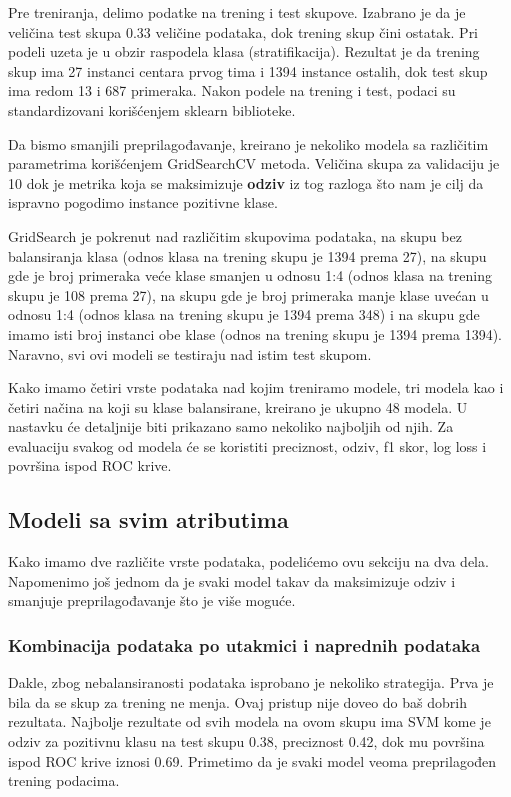 \documentclass[a4paper]{article}
\begin{document}
Pre treniranja, delimo podatke na trening i test skupove. Izabrano je da je
veličina test skupa 0.33 veličine podataka, dok trening skup čini ostatak. Pri
podeli uzeta je u obzir raspodela klasa (stratifikacija). Rezultat je da trening skup ima 27 instanci centara prvog tima i 1394 instance ostalih, dok test skup ima redom 13 i 687 primeraka. Nakon podele na trening i test, podaci su standardizovani korišćenjem sklearn biblioteke.

Da bismo smanjili preprilagođavanje, kreirano je nekoliko modela sa različitim parametrima korišćenjem GridSearchCV metoda. Veličina skupa za validaciju je 10 dok je metrika koja se maksimizuje \textbf{odziv} iz tog razloga što nam je cilj da ispravno pogodimo instance pozitivne klase.

GridSearch je pokrenut nad različitim skupovima podataka, na skupu bez
balansiranja klasa (odnos klasa na trening skupu je 1394 prema 27), na skupu
gde je broj primeraka veće klase smanjen u odnosu 1:4 (odnos klasa na trening
skupu je 108 prema 27), na skupu gde je broj primeraka manje klase uvećan u
odnosu 1:4 (odnos klasa na trening skupu je 1394 prema 348) i na skupu gde
imamo isti broj instanci obe klase (odnos na trening skupu je 1394 prema 1394).
Naravno, svi ovi modeli se testiraju nad istim test skupom.

Kako imamo četiri vrste podataka nad kojim treniramo modele, tri modela
kao i četiri načina na koji su klase balansirane, kreirano je ukupno 48 modela. U
nastavku će detaljnije biti prikazano samo nekoliko najboljih od njih. Za evaluaciju svakog od modela će se koristiti preciznost, odziv, f1 skor, log loss i površina ispod ROC krive.

\subsection{Modeli sa svim atributima}
\label{subsec:svi_atributi}

Kako imamo dve različite vrste podataka, podelićemo ovu sekciju na dva dela. Napomenimo još jednom da je svaki model takav da maksimizuje odziv i smanjuje preprilagođavanje što je više moguće.

\subsubsection{Kombinacija podataka po utakmici i naprednih podataka}
\label{subsubsec:kombo_pg_adv}

Dakle, zbog nebalansiranosti podataka isprobano je nekoliko strategija. Prva
je bila da se skup za trening ne menja. Ovaj pristup nije doveo do baš dobrih
rezultata. Najbolje rezultate od svih modela na ovom skupu ima SVM kome je
odziv za pozitivnu klasu na test skupu 0.38, preciznost 0.42, dok mu površina
ispod ROC krive iznosi 0.69. Primetimo da je svaki model veoma preprilagođen trening podacima.
\end{document}
